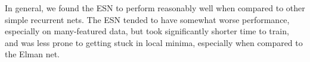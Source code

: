 \documentclass{acm_proc_article-sp}
\begin{document}
In general, we found the ESN to perform reasonably well when compared to other simple recurrent nets. The ESN tended to have somewhat worse performance, especially on many-featured data, but took significantly shorter time to train, and was less prone to getting stuck in local minima, especially when compared to the Elman net.




\balancecolumns
\end{document}
